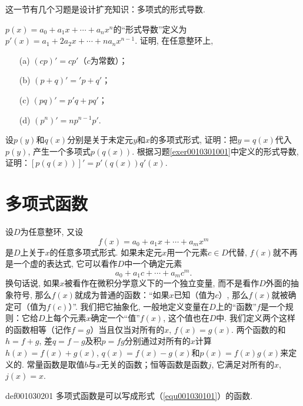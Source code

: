 这一节有几个习题是设计扩充知识：多项式的形式导数. 
\begin{exercise}\label{exer0010301001}
$p(x)=a_0+a_1x+\cdots+a_nx^n$的“形式导数”定义为$p'(x)=a_1+2a_2x+\cdots+na_nx^{n-1}$. 证明, 在任意整环上, 
\begin{enumerate}
\item[(a)] $(cp)'=cp'$（$c$为常数）；
\item[(b)] $(p+q)'='p+q'$；
\item[(c)] $(pq)'=p'q+pq'$；
\item[(d)] $(p^n)'=np^{n-1}p'$. 
\end{enumerate}
\end{exercise}
\begin{exercise}\label{exer0010301002}
设$p(y)$和$q(x)$分别是关于未定元$y$和$x$的多项式形式, 证明：把$y=q(x)$代入$p(y)$, 产生一个多项式$p(q(x))$. 根据习题\ref{exer0010301001}中定义的形式导数, 证明：$[p(q(x))]'=p'(q(x))q'(x)$. 
\end{exercise}



\section{多项式函数}\label{section0010302}
设$D$为任意整环, 又设
\[
f(x)=a_0+a_1x+\cdots+a_mx^m
\]
是$D$上关于$x$的任意多项式形式. 如果未定元$x$用一个元素$c \in D$代替, $f(x)$就不再是一个虚的表达式, 它可以看作$D$中一个确定元素
\[
a_0+a_1c+\cdots+a_mc^m.
\] 
换句话说, 如果$x$被看作在微积分学意义下的一个独立变量, 而不是看作$D$外面的抽象符号, 那么$f(x)$就成为普通的函数：“如果$x$已知（值为$c$）, 那么$f(x)$就被确定可（值为$f(c)$）”. 我们把它抽象化, 一般地定义变量在$D$上的“函数”$f$是一个规则：它给$D$上每个元素$x$确定一个“值”$f(x)$, 这个值也在$D$中. 我们定义两个这样的函数相等（记作$f=g$）当且仅当对所有的$x$, $f(x)=g(x)$. 两个函数的和$h=f+g$, 差$q=f-g$及积$p=fg$分别通过对所有的$x$计算$h(x) = f(x)+g(x)$, $q(x)=f(x)-g(x)$和$p(x)=f(x)g(x)$来定义的. 常量函数是取值$b$与$x$无关的函数；恒等函数是函数$j$, 它满足对所有的$x$, $j(x)=x$. 
\begin{definition}{}{def001030201}
多项式函数是可以写成形式（\ref{equ001030101}）的函数. 
\end{definition}

